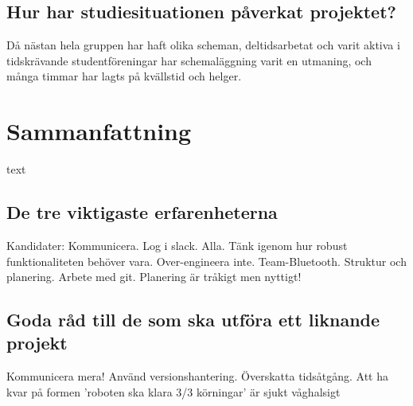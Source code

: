 ﻿\documentclass{article}
\begin{document}
\subsection{Hur har studiesituationen påverkat projektet?}
Då nästan hela gruppen har haft olika scheman, deltidsarbetat och varit aktiva i tidskrävande studentföreningar har schemaläggning varit en utmaning, och många timmar har lagts på kvällstid och helger. 

\clearpage
\section{Sammanfattning}
text

\subsection{De tre viktigaste erfarenheterna}

Kandidater:
Kommunicera. Log i slack. Alla.
Tänk igenom hur robust funktionaliteten behöver vara. Over-engineera inte. Team-Bluetooth.
Struktur och planering. Arbete med git. Planering är tråkigt men nyttigt!


\subsection{Goda råd till de som ska utföra ett liknande projekt}
Kommunicera mera! Använd versionshantering. Överskatta tidsåtgång.
Att ha kvar på formen 'roboten ska klara 3/3 körningar' är sjukt våghalsigt

\nocite{*}
{}

\end{document}
